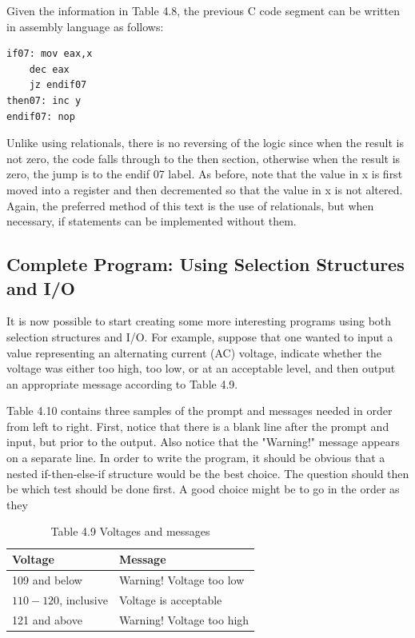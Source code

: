 \documentclass[10pt]{article}
\begin{document}
Given the information in Table 4.8, the previous C code segment can be written in assembly language as follows:

\begin{verbatim}
if07: mov eax,x
    dec eax
    jz endif07
then07: inc y
endif07: nop
\end{verbatim}

Unlike using relationals, there is no reversing of the logic since when the result is not zero, the code falls through to the then section, otherwise when the result is zero, the jump is to the endif 07 label. As before, note that the value in x is first moved into a register and then decremented so that the value in x is not altered. Again, the preferred method of this text is the use of relationals, but when necessary, if statements can be implemented without them.

\subsection*{Complete Program: Using Selection Structures and I/O}
It is now possible to start creating some more interesting programs using both selection structures and I/O. For example, suppose that one wanted to input a value representing an alternating current (AC) voltage, indicate whether the voltage was either too high, too low, or at an acceptable level, and then output an appropriate message according to Table 4.9.

Table 4.10 contains three samples of the prompt and messages needed in order from left to right. First, notice that there is a blank line after the prompt and input, but prior to the output. Also notice that the "Warning!" message appears on a separate line. In order to write the program, it should be obvious that a nested if-then-else-if structure would be the best choice. The question should then be which test should be done first. A good choice might be to go in the order as they

\begin{table}[h]
\begin{center}
\captionsetup{labelformat=empty}
\caption{Table 4.9 Voltages and messages}
\begin{tabular}{|l|l|}
\hline
Voltage & Message \\
\hline
109 and below & Warning! Voltage too low \\
\hline
$110-120$, inclusive & Voltage is acceptable \\
\hline
121 and above & Warning! Voltage too high \\
\hline
\end{tabular}
\end{center}
\end{table}
\end{document}
